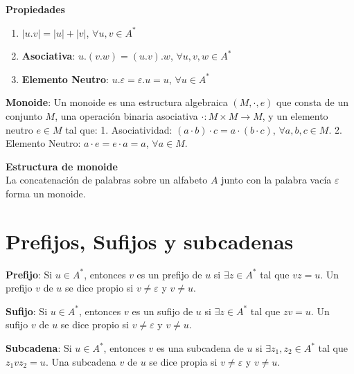 \documentclass[12pt]{report} %
\providecommand{\tightlist}{%
  \setlength{\itemsep}{0pt}\setlength{\parskip}{0pt}}
\begin{document}
\textbf{Propiedades}

\begin{enumerate}
\def\labelenumi{\arabic{enumi}.}
\tightlist
\item
  \(\lvert u.v \rvert = \lvert u \rvert + \lvert v \rvert\),
  \(\forall u, v \in A^*\)\\
\item
  \textbf{Asociativa}: \(u.(v.w) = (u.v).w\),
  \(\forall u, v, w \in A^*\)\\
\item
  \textbf{Elemento Neutro}: \(u.\varepsilon = \varepsilon.u = u\),
  \(\forall u \in A^*\)
\end{enumerate}

\begin{definicion}
\textbf{Monoide}: Un monoide es una estructura algebraica $(M, \cdot, e)$ que consta de un conjunto $M$, una operación binaria asociativa $\cdot : M \times M \to M$, y un elemento neutro $e \in M$ tal que:  
1. Asociatividad: $(a \cdot b) \cdot c = a \cdot (b \cdot c)$, $\forall a, b, c \in M$.  
2. Elemento Neutro: $a \cdot e = e \cdot a = a$, $\forall a \in M$.  
\end{definicion}

\textbf{Estructura de monoide}\\
La concatenación de palabras sobre un alfabeto \(A\) junto con la
palabra vacía \(\varepsilon\) forma un monoide.

\hypertarget{prefijos-sufijos-y-subcadenas}{%
\section{Prefijos, Sufijos y
subcadenas}\label{prefijos-sufijos-y-subcadenas}}

\begin{definicion}
\textbf{Prefijo}: Si $u \in A^*$, entonces $v$ es un prefijo de $u$ si $\exists z \in A^*$ tal que $vz = u$.  
Un prefijo $v$ de $u$ se dice propio si $v \neq \varepsilon$ y $v \neq u$.  
\end{definicion}

\begin{definicion}
\textbf{Sufijo}: Si $u \in A^*$, entonces $v$ es un sufijo de $u$ si $\exists z \in A^*$ tal que $zv = u$.  
Un sufijo $v$ de $u$ se dice propio si $v \neq \varepsilon$ y $v \neq u$.  
\end{definicion}

\begin{definicion}
\textbf{Subcadena}: Si $u \in A^*$, entonces $v$ es una subcadena de $u$ si $\exists z_1, z_2 \in A^*$ tal que $z_1vz_2 = u$.  
Una subcadena $v$ de $u$ se dice propia si $v \neq \varepsilon$ y $v \neq u$.  
\end{definicion}
\end{document}

